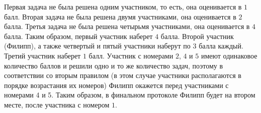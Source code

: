Первая задача не была решена одним участником, то есть, она оценивается в $1$ балл. Вторая
задача не была решена двумя участниками, она оценивается в $2$ балла. Третья задача не была решена четырьмя участниками, она оценивается в $4$ балла. Таким образом, первый участник наберет $4$ балла. Второй участник (Филипп), а также четвертый и пятый участники наберут по $3$ балла каждый. Третий участник наберет $1$ балл. Участник с номерами $2$, $4$ и $5$ имеют одинаковое количество баллов и решили одно и то же количество задач, поэтому в соответствии со вторым правилом (в этом случае участники располагаются в порядке возрастания их номеров) Филипп окажется перед участниками с номерами 4 и 5. Таким образом, в финальном протоколе Филипп будет на втором месте, после участника с номером $1$.

